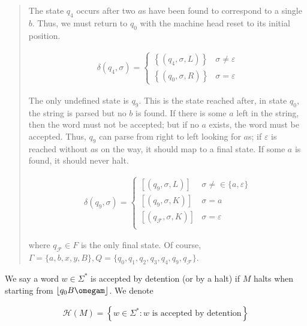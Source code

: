 \documentclass[a4paper, 12pt]{article}
\begin{document}
\begin{quote}
The state $q_4$ occurs after two $a$s have been found to correspond to a single
$b$. Thus, we must return to $q_0$ with the machine head reset to its initial
position. 

\begin{align*}
    \delta(q_4, \sigma) = \begin{cases}
        \left\{ \left( q_4, \sigma, L \right)  \right\} & \sigma \neq \varepsilon
        \\
        \left\{ \left( q_0, \sigma, R \right)  \right\} & \sigma = \varepsilon 
    \end{cases}
\end{align*}

The only undefined state is $q_9$. This is the state reached after, in state
$q_0$, the string is parsed but no $b$ is found. If there is some $a$ left in
the string, then the word must not be accepted; but if no $a$ exists, the word
must be accepted. Thus, $q_9$ can parse from right to left looking for $a$s; if
$\varepsilon$ is reached without $a$s on the way, it should map to a final state.
If some $a$ is found, it should never halt.

\begin{align*}
    \delta(q_9, \sigma) = \begin{cases}
        \left[ \left( q_9, \sigma, L \right)   \right] & \sigma \neq\in \{a,
        \varepsilon\} \\
        \left[ \left( q_9, \sigma, K \right)   \right] & \sigma = a \\ 
        \left[ \left( q_\mathcal{F}, \sigma, K \right)   \right] & \sigma = \varepsilon \\ 
    \end{cases}
\end{align*}

where $q_{\mathcal{F}} \in F$ is the only final state. Of course, $\Gamma = \{a,
b, x, y, B\}, Q = \{ q_0, q_1, q_2, q_3, q_4, q_9, q_{\mathcal{F}}\}$.

\end{quote}
\normalsize

We say a word $w \in \Sigma^{*}$ is accepted by detention (or by a halt) if $M$
halts when starting from $ \left\lfloor q_0 B \omegam \right\rfloor  $. We
denote 

\begin{align*}
    \mathcal{H}(M) = \left\{ w \in \Sigma^{*}: w \text{ is accepted
    by detention} \right\} 
\end{align*}
\end{document}
